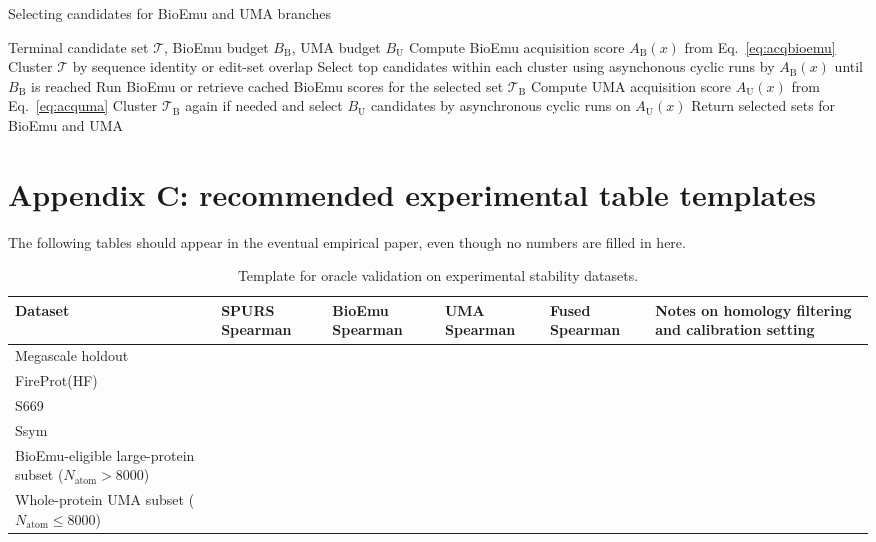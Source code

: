 \documentclass[11pt]{article}
\begin{document}
	\begin{algorithm}[H]
		\caption{Selecting candidates for BioEmu and UMA branches}
		\label{alg:acquire}
		\begin{algorithmic}[1]
			\Require Terminal candidate set $\mathcal{T}$, BioEmu budget $B_{\mathrm B}$, UMA budget $B_{\mathrm U}$
			\State Compute BioEmu acquisition score $A_{\mathrm B}(x)$ from Eq.~\eqref{eq:acqbioemu}
			\EndFor
			\State Cluster $\mathcal{T}$ by sequence identity or edit-set overlap
			\State Select top candidates within each cluster using asynchonous cyclic runs by $A_{\mathrm B}(x)$ until $B_{\mathrm B}$ is reached
			\State Run BioEmu or retrieve cached BioEmu scores for the selected set $\mathcal{T}_{\mathrm B}$
			\State Compute UMA acquisition score $A_{\mathrm U}(x)$ from Eq.~\eqref{eq:acquma}
			\EndFor
			\State Cluster $\mathcal{T}_{\mathrm B}$ again if needed and select $B_{\mathrm U}$ candidates by asynchronous cyclic runs on $A_{\mathrm U}(x)$
			\State Return selected sets for BioEmu and UMA
		\end{algorithmic}
	\end{algorithm}
	
	
	\section{Appendix C: recommended experimental table templates}
	
	The following tables should appear in the eventual empirical paper, even though no numbers are filled in here.
	
	\begin{table}[H]
		\centering
		\caption{Template for oracle validation on experimental stability datasets.}
		\begin{tabularx}{\textwidth}{>{\raggedright\arraybackslash}p{} >{\raggedright\arraybackslash}p{} >{\raggedright\arraybackslash}p{} >{\raggedright\arraybackslash}p{} >{\raggedright\arraybackslash}p{} >{\raggedright\arraybackslash}X}
			\toprule
			Dataset & SPURS Spearman & BioEmu Spearman & UMA Spearman & Fused Spearman & Notes on homology filtering and calibration setting \\
			\midrule
			Megascale holdout &  &  &  &  &  \\
			FireProt(HF) &  &  &  &  &  \\
			S669 &  &  &  &  &  \\
			Ssym &  &  &  &  &  \\
			BioEmu-eligible large-protein subset ($N_{\mathrm{atom}}>8000$) &  &  &  &  &  \\
			Whole-protein UMA subset ($N_{\mathrm{atom}}\leq 8000$) &  &  &  &  &  \\
			\bottomrule
		\end{tabularx}
	\end{table}
	
\end{document}
